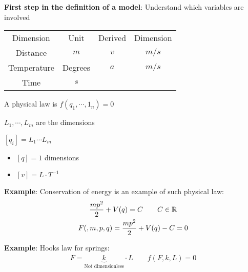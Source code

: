 \noindent\textbf{First step in the definition of a model}: Understand which variables are involved
\par\bigskip
\begin{center}
  \begin{tabular}{c|c|c|c}
    Dimension&Unit&Derived&Dimension\\
    Distance&$m$&$v$&$m/s$\\
    Temperature&Degrees&$a$&$m/s$\\
    Time&$s$&&
  \end{tabular}
\end{center}
\par\bigskip
\begin{theo}{}
  A physical law is $f(q_1,\cdots,1_n) = 0$
  \par\bigskip
  \noindent $L_1,\cdots, L_m$ are the dimensions\par
  \noindent $[q_i] = L_1\cdots L_m$
  \par\bigskip
  \begin{itemize}
    \item $[q] = 1$ dimensions
    \item $[v] = L\cdot T^{-1}$
  \end{itemize}
\end{theo}
\par\bigskip
\noindent\textbf{Example}:
\noindent Conservation of energy is an example of such physical law:
\begin{equation*}
  \begin{gathered}
    \dfrac{mp^2}{2}+V(q) = C\qquad C\in\mathbb{R}\\
    F(,m,p,q) = \dfrac{mp^2}{2}+V(q)-C = 0
  \end{gathered}
\end{equation*}
\par\bigskip
\noindent\textbf{Example}:
\noindent Hooks law for springs:
\begin{equation*}
  \begin{gathered}
    F = \underbrace{k}_{\text{Not dimensionless}}\cdot L\qquad f(F,k,L) = 0
  \end{gathered}
\end{equation*}
\par\bigskip
